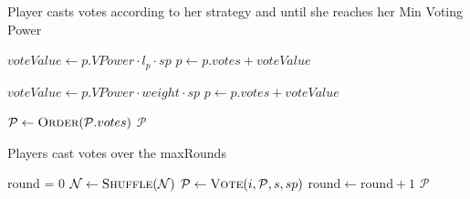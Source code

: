     \begin{algorithm}[H]
      \caption{Player casts votes according to her strategy and until she
      reaches her Min Voting Power}
      \label{alg:vote}
      \begin{algorithmic}[1]
              \State
                \State $voteValue \leftarrow p.VPower \cdot l_p \cdot sp$
                \State $p \leftarrow p.votes +  voteValue$
              \EndIf
            \EndFor
          \EndCase

               \State
                 \State $voteValue \leftarrow p.VPower \cdot weight \cdot sp$
                 \State $p \leftarrow p.votes +  voteValue$
               \EndIf
             \EndFor
          \EndCase
        \EndSwitch

        \State $\mathcal{P} \leftarrow \textsc{Order}(\mathcal{P}.votes)$
        \State \Return $\mathcal{P}$
      \EndFunction
      \end{algorithmic}
    \end{algorithm}

    \begin{algorithm}[H]
      \caption{Players cast votes over the maxRounds}
      \label{alg:curation}
      \begin{algorithmic}[1]
        \State round = 0
          \State $\mathcal{N} \leftarrow \textsc{Shuffle}(\mathcal{N})$
              \State $\mathcal{P} \leftarrow \textsc{Vote}(i,\mathcal{P}, s,sp)$
            \EndFor
          \State $\mathrm{round} \leftarrow \mathrm{round} + 1$
        \EndWhile
        \State \Return $\mathcal{P}$
      \EndFunction
      \end{algorithmic}
    \end{algorithm}


